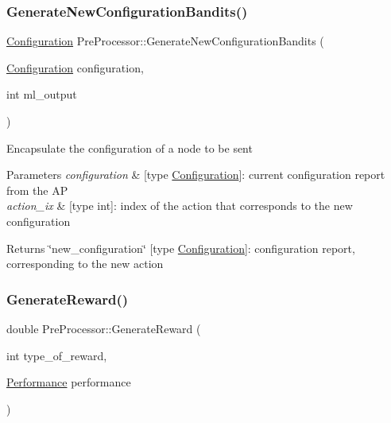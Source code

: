 \subsubsection{\texorpdfstring{Generate\+New\+Configuration\+Bandits()}{GenerateNewConfigurationBandits()}}
{\footnotesize\ttfamily \hyperlink{structConfiguration}{Configuration} Pre\+Processor\+::\+Generate\+New\+Configuration\+Bandits (\begin{DoxyParamCaption}\item[{\hyperlink{structConfiguration}{Configuration}}]{configuration,  }\item[{int}]{ml\+\_\+output }\end{DoxyParamCaption})\hspace{0.3cm}{\ttfamily [inline]}}

Encapsulate the configuration of a node to be sent 
\begin{DoxyParams}{Parameters}
{\em configuration} & \mbox{[}type \hyperlink{structConfiguration}{Configuration}\mbox{]}\+: current configuration report from the AP \\
\hline
{\em action\+\_\+ix} & \mbox{[}type int\mbox{]}\+: index of the action that corresponds to the new configuration \\
\hline
\end{DoxyParams}
\begin{DoxyReturn}{Returns}
\char`\"{}new\+\_\+configuration\char`\"{} \mbox{[}type \hyperlink{structConfiguration}{Configuration}\mbox{]}\+: configuration report, corresponding to the new action 
\end{DoxyReturn}
\mbox{\label{classPreProcessor_ab5d4746e7a0360611e5ef492db5ceec0}} 
\subsubsection{\texorpdfstring{Generate\+Reward()}{GenerateReward()}}
{\footnotesize\ttfamily double Pre\+Processor\+::\+Generate\+Reward (\begin{DoxyParamCaption}\item[{int}]{type\+\_\+of\+\_\+reward,  }\item[{\hyperlink{structPerformance}{Performance}}]{performance }\end{DoxyParamCaption})\hspace{0.3cm}{\ttfamily [inline]}}

